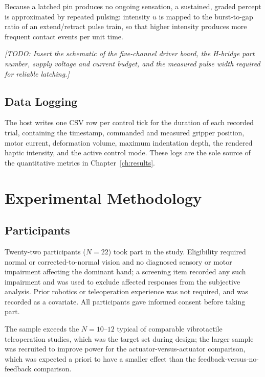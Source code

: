 \documentclass[12pt, a4paper, twoside, openright]{report}
\newcommand{\todo}[1]{\textit{[TODO: #1]}}
\begin{document}
Because a latched pin produces no ongoing sensation, a sustained, graded
percept is approximated by repeated pulsing: intensity $u$ is mapped to the
burst-to-gap ratio of an extend/retract pulse train, so that higher intensity
produces more frequent contact events per unit time.

\todo{Insert the schematic of the five-channel driver board, the H-bridge part
    number, supply voltage and current budget, and the measured pulse width required
    for reliable latching.}

\section{Data Logging}
\label{sec:logging-arch}

The host writes one CSV row per control tick for the duration of each recorded
trial, containing the timestamp, commanded and measured gripper position, motor
current, deformation volume, maximum indentation depth, the rendered haptic
intensity, and the active control mode. These logs are the sole source of the
quantitative metrics in Chapter~\ref{ch:results}.

\chapter{Experimental Methodology}
\label{ch:methodology}

\section{Participants}
\label{sec:participants}

Twenty-two participants ($N=22$) took part in the study. Eligibility required
normal or corrected-to-normal vision and no diagnosed sensory or motor
impairment affecting the dominant hand; a screening item recorded any such
impairment and was used to exclude affected responses from the subjective
analysis. Prior robotics or teleoperation experience was not required, and was
recorded as a covariate. All participants gave informed consent before taking
part.

The sample exceeds the $N=10$--$12$ typical of comparable vibrotactile
teleoperation studies, which was the target set during design; the larger sample
was recruited to improve power for the actuator-versus-actuator comparison,
which was expected a priori to have a smaller effect than the
feedback-versus-no-feedback comparison.
\end{document}
